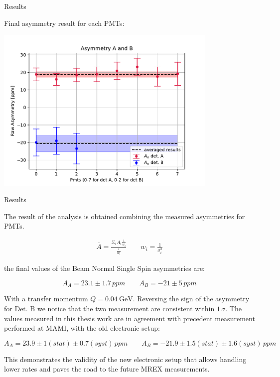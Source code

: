 \documentclass[9pt,a4paper]{beamer}
\begin{document}
\begin{frame}{Results}
\begin{center}
Final asymmetry result for each PMTs:
\end{center}
\begin{center}
\includegraphics[width = 0.80\textwidth]{figures/FirstResult.pdf}
\end{center}

\end{frame}

\begin{frame}{Results}

The result of the analysis is obtained combining the measured asymmetries for PMTs. 

\begin{gather*}
\overline{A} =  \frac{\Sigma_{i} A_{i} \frac{1}{w_{i}}}{\frac{1}{w_{i}}} \qquad w_{i} = \frac{1}{\sigma^{2}_{i}}
\end{gather*}

the final values of the Beam Normal Single Spin asymmetries are:

\begin{equation}
A_{A} = 23.1 \pm 1.7 \, ppm  \qquad A_{B} = -21 \pm 5 \, ppm
\end{equation}

With a transfer momentum $Q = \SI{0.04}{\giga \electronvolt}$. Reversing the sign of the asymmetry for Det. B we notice that the two measurement are consistent within $1 \, \sigma$. The values measured in this thesis work are in agreement with precedent measurement performed at MAMI, with the old electronic setup:

\begin{equation}
A_{A} = 23.9 \pm 1(stat) \pm 0.7 (syst) \, ppm  \qquad A_{B} = -21.9 \pm 1.5(stat) \pm 1.6(syst) \, ppm
\end{equation}

This demonstrates the validity of the new electronic setup that allows handling lower rates and paves the road to the future MREX measurements.

\end{frame}
\end{document}
